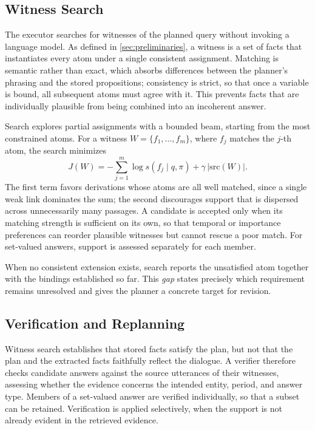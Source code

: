 \subsection{Witness Search}
\label{sec:method-prove}

The executor searches for witnesses of the planned query without invoking
a language model. As defined in \cref{sec:preliminaries}, a witness is a
set of facts that instantiates every atom under a single consistent
assignment. Matching is semantic rather than exact, which absorbs
differences between the planner's phrasing and the stored propositions;
consistency is strict, so that once a variable is bound, all subsequent
atoms must agree with it. This prevents facts that are individually
plausible from being combined into an incoherent answer.

Search explores partial assignments with a bounded beam, starting from
the most constrained atoms. For a witness $W=\{f_1,\ldots,f_m\}$, where
$f_j$ matches the $j$-th atom, the search minimizes
\begin{equation}
 J(W)=-\sum_{j=1}^{m}\log s(f_j\mid q,\pi)
       +\gamma\,|\mathrm{src}(W)|.
 \label{eq:witness-search}
\end{equation}
The first term favors derivations whose atoms are all well matched, since
a single weak link dominates the sum; the second discourages support
that is dispersed across unnecessarily many passages. A candidate is
accepted only when its matching strength is sufficient on its own, so
that temporal or importance preferences can reorder plausible witnesses
but cannot rescue a poor match. For set-valued answers, support is
assessed separately for each member.

When no consistent extension exists, search reports the unsatisfied atom
together with the bindings established so far. This \emph{gap} states
precisely which requirement remains unresolved and gives the planner a
concrete target for revision.

\subsection{Verification and Replanning}
\label{sec:method-verify}

Witness search establishes that stored facts satisfy the plan, but not
that the plan and the extracted facts faithfully reflect the dialogue.
A verifier therefore checks candidate answers against the source
utterances of their witnesses, assessing whether the evidence concerns
the intended entity, period, and answer type. Members of a set-valued
answer are verified individually, so that a subset can be retained.
Verification is applied selectively, when the support is not already
evident in the retrieved evidence.

